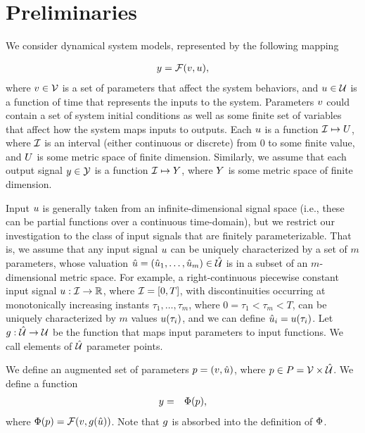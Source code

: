 \section{Preliminaries}

We consider dynamical system models, represented by the following mapping

\begin{eqnarray}
y = \mathcal{F} (v, u),
\end{eqnarray}
where $v \in \mathcal{V}$ is a set of parameters that affect the system behaviors, and $u \in \mathcal{U}$ is a function of time that represents the inputs to the system.
Parameters $v$ could contain a set of system initial conditions as well as some finite set of variables that affect how the system maps inputs to outputs.
Each $u$ is a function $\mathcal{I} \mapsto U$, where $\mathcal{I}$ is an interval (either continuous or discrete) from $0$ to some finite value, and $U$ is some metric space of finite dimension.
Similarly, we assume that each output signal $y \in \mathcal{Y}$ is a function $\mathcal{I} \mapsto Y$, where $Y$ is some metric space of finite dimension.

Input $u$ is generally taken from an infinite-dimensional signal space (i.e., these can be partial functions over a continuous time-domain), but we restrict our investigation to the class of  input signals that are finitely parameterizable. That is, we assume that any input signal $u$ 
can be uniquely characterized by a set of $m$ parameters, whose valuation $\hat{u} =(\hat{u}_1,\ldots,\hat{u}_m) \in \hat{\mathcal{U}}$ is in a subset of an $m$-dimensional metric space. For example, a right-continuous piecewise constant input signal $u:\mathcal{I} \rightarrow \mathbb{R}$, where $\mathcal{I}=[ 0,T ]$, with discontinuities occurring at monotonically increasing instants $\tau_1,\ldots, \tau_m$, where $0=\tau_1<\tau_m<T$, can be uniquely characterized by $m$ values $u(\tau_i)$, and we can define $\hat{u}_i=u(\tau_i)$. Let $g:\hat{\mathcal{U}} \rightarrow \mathcal{U}$ be the function that maps input parameters to input functions. We call elements of $\hat{\mathcal{U}}$ parameter points. 

We define an augmented set of parameters $p = (v, \hat{u})$, where $p\in P = \mathcal{V} \times \hat{\mathcal{U}}$.
We define a function 
\begin{eqnarray} \label{eq:behaviorfunc}
y &=& \Phi(p),
\end{eqnarray}
where $\Phi(p) = \mathcal{F} (v, g(\hat{u}))$.
Note that $g$ is absorbed into the definition of $\Phi$.

